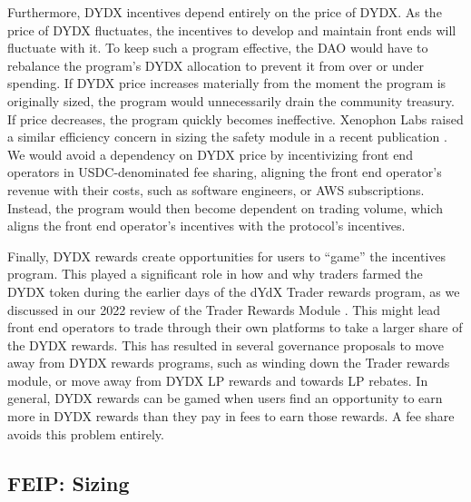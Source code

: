            Furthermore, DYDX incentives depend entirely on the price of DYDX. As the price of DYDX fluctuates, the incentives to develop and maintain front ends will fluctuate with it. To keep such a program effective, the DAO would have to rebalance the program's DYDX allocation to prevent it from over or under spending. If DYDX price increases materially from the moment the program is originally sized, the program would unnecessarily drain the community treasury. If price decreases, the program quickly becomes ineffective. Xenophon Labs raised a similar efficiency concern in sizing the safety module in a recent publication \cite{holloway2023dydx}. We would avoid a dependency on DYDX price by incentivizing front end operators in USDC-denominated fee sharing, aligning the front end operator's revenue with their costs, such as software engineers, or AWS subscriptions. Instead, the program would then become dependent on trading volume, which aligns the front end operator's incentives with the protocol's incentives.

            Finally, DYDX rewards create opportunities for users to ``game'' the incentives program. This played a significant role in how and why traders farmed the DYDX token during the earlier days of the dYdX Trader rewards program, as we discussed in our 2022 review of the Trader Rewards Module \cite{cintra-holloway}. This might lead front end operators to trade through their own platforms to take a larger share of the DYDX rewards. This has resulted in several governance proposals to move away from DYDX rewards programs, such as winding down the Trader rewards module, or move away from DYDX LP rewards and towards LP rebates. In general, DYDX rewards can be gamed when users find an opportunity to earn more in DYDX rewards than they pay in fees to earn those rewards. A fee share avoids this problem entirely.



        \subsection{FEIP: Sizing}
            
